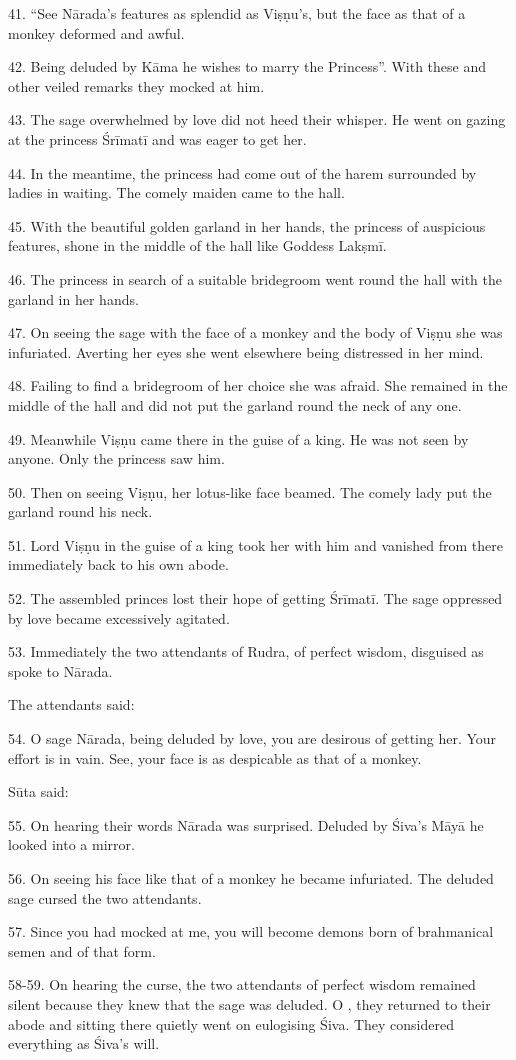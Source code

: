 41. “See Nārada’s features as splendid as Viṣṇu’s, but the face as that of
a monkey deformed and awful.

42. Being deluded by Kāma he wishes to marry the Princess”. With these and other
veiled remarks they mocked at him.

43. The sage overwhelmed by love did not heed their whisper. He went on gazing
at the princess Śrīmatī and was eager to get her.

44. In the meantime, the princess had come out of the harem surrounded by ladies
in waiting. The comely maiden came to the hall.

45. With the beautiful golden garland in her hands, the princess of auspicious
features, shone in the middle of the  hall like Goddess Lakṣmī.

46. The princess in search of a suitable bridegroom went round the hall with
the garland in her hands.

47. On seeing the sage with the face of a monkey and the body of Viṣṇu she was
infuriated. Averting her eyes she went elsewhere being distressed in her mind.

48. Failing to find a bridegroom of her choice she was afraid. She remained in
the middle of the hall and did not put the garland round the neck of any one.

49. Meanwhile Viṣṇu came there in the guise of a king. He was not seen by
anyone. Only the princess saw him.

50. Then on seeing Viṣṇu, her lotus-like face beamed. The comely lady put
the garland round his neck.

51. Lord Viṣṇu in the guise of a king took her with him and vanished from there
immediately back to his own abode.

52. The assembled princes lost their hope of getting Śrīmatī. The sage oppressed
by love became excessively agitated.

53. Immediately the two attendants of Rudra, of perfect wisdom, disguised as
 spoke to Nārada.

The attendants said:

54. O sage Nārada, being deluded by love, you are desirous of getting her. Your
effort is in vain. See, your face is as despicable as that of a monkey.

Sūta said:

55. On hearing their words Nārada was surprised. Deluded by Śiva’s Māyā he
looked into a mirror.

56. On seeing his face like that of a monkey he became infuriated. The deluded
sage cursed the two attendants.

57. Since you had mocked at me, you will become demons born of brahmanical semen
and of that form.

58-59. On hearing the curse, the two attendants of perfect wisdom remained
silent because they knew that the sage was deluded. O , they
returned to their abode and sitting there quietly went on eulogising Śiva.
They considered everything as Śiva’s will.
